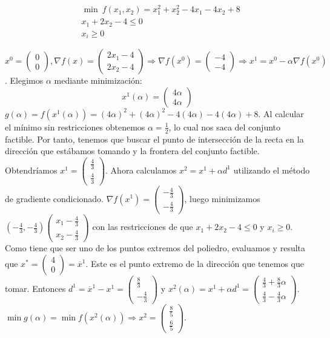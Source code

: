 \documentclass[MIOP.tex]{subfiles}
\begin{document}
\begin{ej}
\begin{align*}
&\min\ f(x_1,x_2)=x_1^2+x_2^2-4x_1-4x_2+8\\
& x_1+2x_2-4\leq 0\\
& x_i\geq 0
\end{align*}

$x^0=\begin{pmatrix}
0\\
0
\end{pmatrix}, \nabla f(x)=\begin{pmatrix}
2x_1-4\\
2x_2-4
\end{pmatrix}\Rightarrow \nabla f(x^0)=\begin{pmatrix}
-4\\
-4
\end{pmatrix}\Rightarrow x^1=x^0-\alpha\nabla f(x^0)$. Elegimos $\alpha$ mediante minimización:
\[x^1(\alpha)=\begin{pmatrix}
4\alpha\\
4\alpha
\end{pmatrix}
\]
$g(\alpha)=f(x^1(\alpha))=(4\alpha)^2+(4\alpha)^2-4(4\alpha)-4(4\alpha)+8$. Al calcular el mínimo sin restricciones obtenemos $\alpha=\frac{1}{2}$, lo cual nos saca del conjunto factible. Por tanto, tenemos que buscar el punto de intersección de la recta en la dirección que estábamos tomando y la frontera del conjunto factible. Obtendríamos $x^1=\begin{pmatrix}
\frac{4}{3}\\
\frac{4}{3}
\end{pmatrix}$. Ahora calculamos $x^2=x^1+\alpha d^1$ utilizando el método de gradiente condicionado. $\nabla f(x^1)=\begin{pmatrix}
-\frac{4}{3}\\
-\frac{4}{3}
\end{pmatrix}$, luego minimizamos $(-\frac{4}{3},-\frac{4}{3})\begin{pmatrix}
x_1-\frac{4}{3}\\
x_2-\frac{4}{3}
\end{pmatrix}$ con las restricciones de que $x_1+2x_2-4\leq 0$ y $x_i\geq 0$. Como tiene que ser uno de los puntos extremos del poliedro, evaluamos y resulta que $x^*=\begin{pmatrix}
4\\
0
\end{pmatrix}=\overline{x}^1 $. Este es el punto extremo de la dirección que tenemos que tomar. Entonces $d^1=\overline{x}^1-x^1=\begin{pmatrix}
\frac{8}{3}\\
-\frac{4}{3}
\end{pmatrix}$ y $x^2(\alpha)=x^1+\alpha d^1=\begin{pmatrix}
\frac{4}{3}+\frac{8}{3}\alpha\\
\frac{4}{3}-\frac{4}{3}\alpha
\end{pmatrix}$. $\min g(\alpha)=\min f(x^2(\alpha))\Rightarrow x^2=\begin{pmatrix}
\frac{8}{5}\\
\frac{6}{5}
\end{pmatrix}$.
\end{ej}
\end{document}
